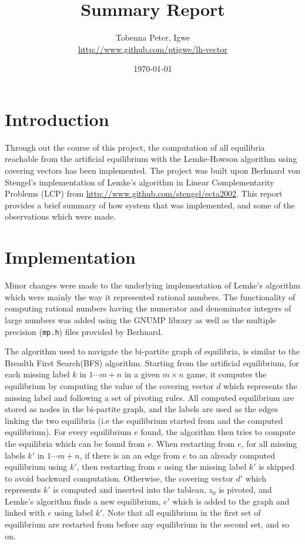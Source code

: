 \documentclass[a4paper,12pt]{article}  %
\title{Summary Report}
\author{Tobenna Peter, Igwe\\ \small{\url{http://www.github.com/ptigwe/lh-vector}}}
\date{\today}
\begin{document}
    \maketitle
    \section{Introduction}
    Through out the course of this project, the computation of all equilibria reachable
    from the artificial equilibrium with the Lemke-Howson algorithm using covering
    vectors has been implemented. The project was built upon Berhnard von Stengel's
    implementation of Lemke's algorithm in Linear Complementarity Problems (LCP) from
    \url{http://www.github.com/stengel/ecta2002}. This
    report provides a brief summary of how system that was implemented, and some of
    the observations which were made.
    
    \section{Implementation}
    Minor changes were made to the underlying implementation of Lemke's algorithm
    which were mainly the way it represented rational numbers. The functionality
    of computing rational numbers having the numerator and denominator integers
    of large numbers was added using the GNUMP library as well as the multiple
    precision (\verb|mp.h|) files provided by Berhnard.
    
    The algorithm used to navigate the bi-partite graph of equilibria, is similar
    to the Breadth First Search(BFS) algorithm. Starting from the artificial
    equilibrium, for each missing label $k$ in ${1 \cdots m+n}$ in a given
    $m \times n$ game, it computes the equilibrium by computing the
    value of the covering vector $d$ which represents the missing label and
    following a set of pivoting rules. All computed equilibrium are stored as nodes
    in the bi-partite graph, and the labels are used as the edges linking the two
    equilibria (i.e the equilibrium started from and the computed equilibrium).
    For every equilibrium $e$ found, the algorithm then tries to compute the
    equilibria which can be found from $e$. When restarting from $e$, for all
    missing labels $k'$ in ${1 \cdots m+n}$, if there is an an edge from $e$ to
    an already computed equilibrium using $k'$, then restarting from $e$ using the
    missing label $k'$ is skipped to avoid backward computation. Otherwise, the
    covering vector $d'$ which represents $k'$ is computed and inserted into the
    tableau, $z_0$ is pivoted, and Lemke's algorithm finds a new equilibrium, $e'$
    which is added to the graph and linked with $e$ using label $k'$. Note that
    all equilibrium in the first set of equilibrium are restarted from before any
    equilibrium in the second set, and so on.
    
\end{document}
